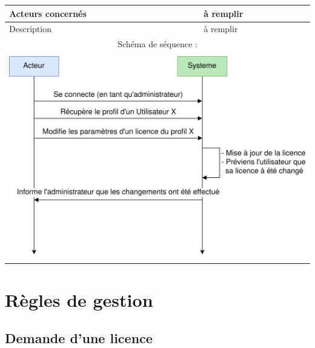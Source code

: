 \begin{table}[!h]
        \centering
        \begin{tabular}{| m{5cm} | m{10cm} |}
                \hline
                    Acteurs concernés & à remplir \\
                \hline
                    Description & à remplir \\
                \hline
                    \multicolumn{2}{|c|}{Schéma de séquence :} \\
                \hline
                    \multicolumn{2}{|c|}{}\\
                    \multicolumn{2}{|c|}{\includegraphics[width=15cm]{main/png/seq_parametrage.png}} \\
                \hline
        \end{tabular}
        \label{tab:tab5}
\end{table}
\newpage

\section{Règles de gestion}

\subsection{Demande d'une licence}

